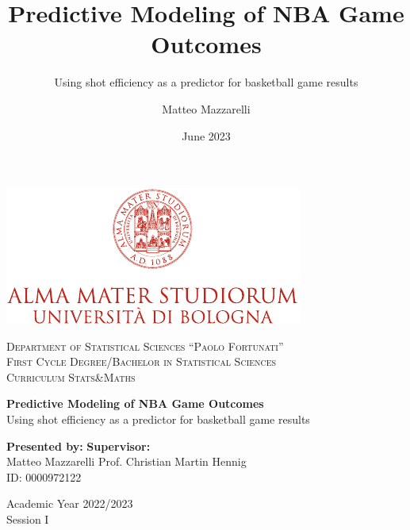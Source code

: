 \documentclass[
  12pt,
  a4paper,
]{article}
\title{\textbf{Predictive Modeling of NBA Game Outcomes}}
\subtitle{Using shot efficiency as a predictor for basketball game results}
\author{Matteo Mazzarelli}
\date{June 2023}
\begin{document}
\maketitle

\begin{titlepage}
    \vspace*{1.75cm}
    \begin{center}
        \includegraphics{./images/unibo-logo.pdf}
    \end{center}
    \vspace{1cm}
    \begin{center}
        {\large \textsc{Department of Statistical Sciences ``Paolo Fortunati''}}\\[0.5cm]
        {\Large \textsc{First Cycle Degree/Bachelor in Statistical Sciences}}\\
        {\Large \textsc{Curriculum Stats\&Maths}}\\[1cm]
    \end{center}
    \vspace{1cm}
    \begin{center}
        {\LARGE \textbf{Predictive Modeling of NBA Game Outcomes}}\\[0.5cm]
        {\Large {Using shot efficiency as a predictor for basketball game results}}\\[1cm]
    \end{center}
    \vfill
    {\large \textbf{Presented by:}}
    \hfill
    {\large \textbf{Supervisor:}}\\
    {\large Matteo Mazzarelli}
    \hfill
    {\large Prof. Christian Martin Hennig}\\
    {\large ID: 0000972122}
    \vfill
    \begin{center}
        {\large{Academic Year 2022/2023\\
                Session I}\\}
    \end{center}
    \vspace*{2.5cm}
\end{titlepage}
\end{document}
